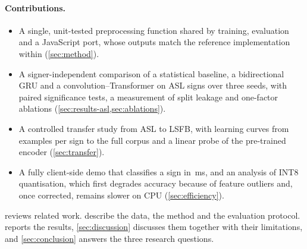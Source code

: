 \paragraph{Contributions.}
\begin{itemize}
  \item A single, unit-tested preprocessing function shared by training, evaluation and a
        JavaScript port, whose outputs match the reference implementation within \numJsParity{}
        (\cref{sec:method}).
  \item A signer-independent comparison of a statistical baseline, a bidirectional GRU and a
        convolution--Transformer on \numAslClasses{} ASL signs over three seeds, with paired
        significance tests, a measurement of split leakage and one-factor ablations
        (\cref{sec:results-asl,sec:ablations}).
  \item A controlled transfer study from ASL to LSFB, with learning curves from \numLcMin{}
        examples per sign to the full corpus and a linear probe of the pre-trained encoder
        (\cref{sec:transfer}).
  \item A fully client-side demo that classifies a sign in \numFpBrowser{}\,ms, and an analysis
        of INT8 quantisation, which first degrades accuracy because of feature outliers and,
        once corrected, remains slower on CPU (\cref{sec:efficiency}).
\end{itemize}

 reviews related work.  describe the
data, the method and the evaluation protocol.  reports the results,
\cref{sec:discussion} discusses them together with their limitations, and
\cref{sec:conclusion} answers the three research questions.

